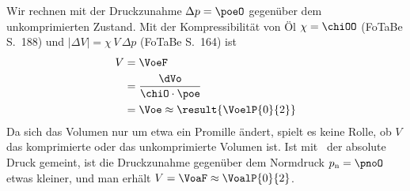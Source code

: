 Wir rechnen mit der Druckzunahme $\Delta p = \poeO$ gegenüber dem unkomprimierten Zustand. Mit der Kompressibilität von Öl $\chi = \chiOO$ (FoTaBe S.~188) und $|\Delta V| = \chi\,V\,\Delta p$ (FoTaBe S.~164) ist
\begin{align}
 V &= \VoeF \\
   &= \frac{\dVo}{\chiO\cdot\poe} \\
   &= \Voe \approx \result{\VoelP{0}{2}}
\end{align}
Da sich das Volumen nur um etwa ein Promille ändert, spielt es keine Rolle, ob $V$ das komprimierte oder das unkomprimierte Volumen ist. Ist mit \poeO\ der absolute Druck gemeint, ist die Druckzunahme gegenüber dem Normdruck $p_\mathrm{n} = \pnoO$ etwas kleiner, und man erhält $V = \VoaF \approx \VoalP{0}{2}$.
